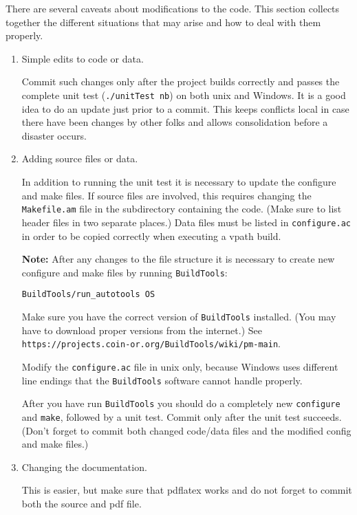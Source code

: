 \label{section:ModifyingProject} 

There are several caveats about modifications to the code. This section collects together the different situations that may arise and how to deal with them properly.

\begin{enumerate}

\item Simple edits to code or data.

Commit such changes only after the project builds correctly and passes the complete unit test 
({\tt ./unitTest nb}) on both unix and Windows. It is a good idea to do an update just prior to a commit. This keeps conflicts local in case there have been changes by other folks and allows consolidation before a disaster occurs. 

\item Adding source files or data.

In addition to running the unit test it is necessary to update the configure and make files. 
If source files are involved, this requires changing the {\tt Makefile.am} file in the subdirectory 
containing the code. (Make sure to list header files in two separate places.) Data files must be listed in 
{\tt configure.ac} in order to be copied correctly when executing a vpath build. 


{\bf Note:} After any changes to the file structure it is necessary to create new configure and make files by running {\tt BuildTools}:
\begin{verbatim}
BuildTools/run_autotools OS
\end{verbatim}

Make sure you have the correct version of {\tt BuildTools} installed. (You may have to download proper versions from the internet.) See {\tt https://projects.coin-or.org/BuildTools/wiki/pm-main}.

Modify the {\tt configure.ac} file in unix only, because Windows uses different line endings that the 
{\tt BuildTools} software cannot handle properly. 


\medskip

After you have run {\tt BuildTools} you should do a completely new {\tt configure} and {\tt make}, followed by a unit test. Commit only after the unit test succeeds. (Don't forget to commit both changed code/data files and the modified config and make files.)

\item Changing the documentation.

This is easier, but make sure that pdflatex works and do not forget to commit both the source and pdf file. 

\end{enumerate}

